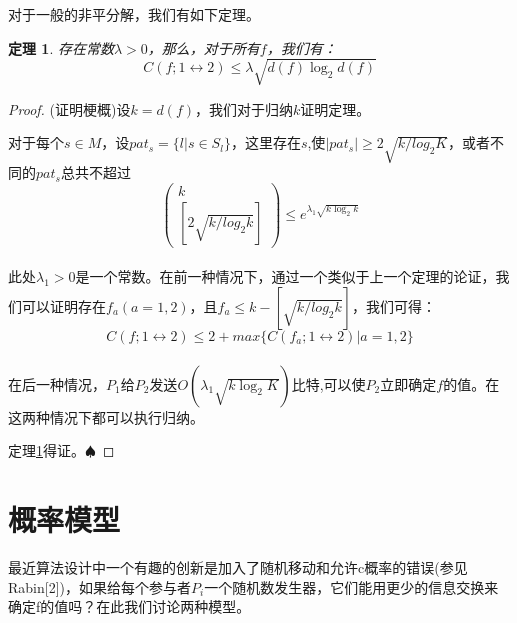 \documentclass[]{article}
\newtheorem{theorem}{定理}
\newtheorem*{proof}{证明}
\begin{document}
	对于一般的非平分解，我们有如下定理。\par
	\begin{theorem}\label{theo3}
		存在常数$\lambda >0$，那么，对于所有$f$，我们有：
		\[C(f;1\leftrightarrow 2)\leq \lambda \sqrt{d(f)\log_2 d(f)}\]
	\end{theorem}
	\begin{proof}
		(证明梗概)设$k=d(f)$，我们对于归纳$k$证明定理。\par
		对于每个$s\in M$，设$pat_s = \{l | s\in S_l\}$，这里存在$s$,使$|pat_s| \geq 2\sqrt{k/log_2 K}$，或者不同的$pat_s$总共不超过
		\begin{equation}\nonumber
		 \left(
			\begin{array}{c}
			    k \\
			    \left[ 2 \sqrt{k/log_2 k}\right] 
			\end{array}
		\right) \leq e^{\lambda_1 \sqrt{k\log_2 k}}
		\end{equation}
		\\
		此处$\lambda_1 >0$是一个常数。在前一种情况下，通过一个类似于上一个定理的论证，我们可以证明存在$f_a(a=1,2)$，且$f_a\leq k-\left[ \sqrt{k/log_2 k} \right] $，我们可得：
		\begin{equation}\label{equa5}
			C(f;1\leftrightarrow 2)\leq 2+ max\{C(f_a;1\leftrightarrow 2)|a=1,2\}
		\end{equation}
		\\
		在后一种情况，$P_1$给$P_2$发送$O(\lambda_1 \sqrt{k\log_2 K})$比特,可以使$P_2$立即确定$f$的值。在这两种情况下都可以执行归纳。
		\par
		定理\ref{theo3}得证。$\spadesuit$
	\end{proof}
	
	
	

	\section{概率模型}
	最近算法设计中一个有趣的创新是加入了随机移动和允许c概率的错误(参见Rabin[2])，如果给每个参与者$P_i$一个随机数发生器，它们能用更少的信息交换来确定f的值吗？在此我们讨论两种模型。
	
\end{document}
